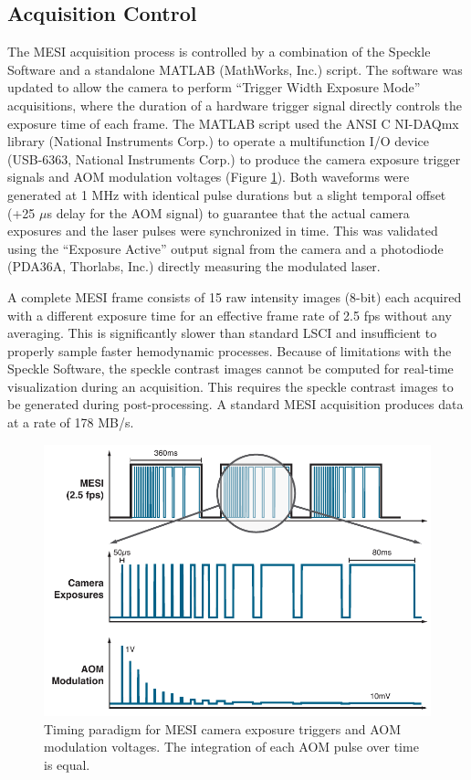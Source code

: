 \subsection{Acquisition Control}

The MESI acquisition process is controlled by a combination of the Speckle Software and a standalone MATLAB (MathWorks, Inc.) script. The software was updated to allow the camera to perform ``Trigger Width Exposure Mode'' acquisitions, where the duration of a hardware trigger signal directly controls the exposure time of each frame. The MATLAB script used the ANSI C NI-DAQmx library (National Instruments Corp.) to operate a multifunction I/O device (USB-6363, National Instruments Corp.) to produce the camera exposure trigger signals and AOM modulation voltages (Figure \ref{fig:mesitimingschematic}). Both waveforms were generated at 1 MHz with identical pulse durations but a slight temporal offset (+25 $\mu$s delay for the AOM signal) to guarantee that the actual camera exposures and the laser pulses were synchronized in time. This was validated using the ``Exposure Active'' output signal from the camera and a photodiode (PDA36A, Thorlabs, Inc.) directly measuring the modulated laser.

A complete MESI frame consists of 15 raw intensity images (8-bit) each acquired with a different exposure time for an effective frame rate of 2.5 fps without any averaging. This is significantly slower than standard LSCI and insufficient to properly sample faster hemodynamic processes. Because of limitations with the Speckle Software, the speckle contrast images cannot be computed for real-time visualization during an acquisition. This requires the speckle contrast images to be generated during post-processing. A standard MESI acquisition produces data at a rate of 178 MB/s.

\begin{figure}
    \includegraphics{figures/chapter_4/mesitimingschematic.pdf}
    \caption{
        \label{fig:mesitimingschematic}
        Timing paradigm for MESI camera exposure triggers and AOM modulation voltages. The integration of each AOM pulse over time is equal.
    }
\end{figure}

